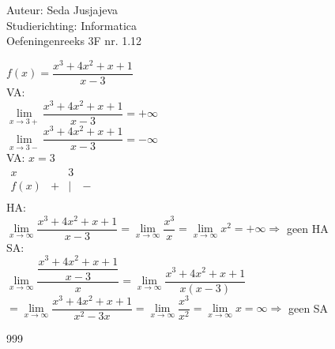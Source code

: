 \documentclass[a4paper]{article}
\newcommand{\limit}{\lim\limits}
\begin{document}
\noindent \large Auteur: Seda Jusjajeva\\
\noindent \large Studierichting: Informatica\\
\noindent \large Oefeningenreeks 3F nr. 1.12 \\

\medskip

\normalsize


$f(x) = \dfrac{x^3 + 4x^2 + x + 1}{x - 3}$ \\

VA: \\

$\limit_{x\rightarrow3+}\dfrac{x^3 + 4x^2 + x + 1}{x - 3} = +\infty$ \\

$\limit_{x\rightarrow3-}\dfrac{x^3 + 4x^2 + x + 1}{x - 3} = -\infty$ \\

VA: $x = 3$\\

$\begin{array}{r|cccc}
    x    &   & 3 &   & \\
    \hline
    f(x) & + & | & - & \\
\end{array}$ \\

HA: \\

$\limit_{x\rightarrow\infty}\dfrac{x^3 + 4x^2 + x + 1}{x - 3} = \limit_{x\rightarrow\infty}\dfrac{x^3}{x} = \limit_{x\rightarrow\infty} x^2 = +\infty \Rightarrow$ geen HA \\

SA: \\

$\limit_{x\rightarrow\infty}\dfrac{\dfrac{x^3 + 4x^2 + x + 1}{x - 3}}{x} = \limit_{x\rightarrow\infty}\dfrac{x^3 + 4x^2 + x + 1}{x(x - 3)}$ \\

$= \limit_{x\rightarrow\infty}\dfrac{x^3 + 4x^2 + x + 1}{x^2 - 3x} = \limit_{x\rightarrow\infty}\dfrac{x^3}{x^2} = \limit_{x\rightarrow\infty} x = \infty\Rightarrow$ geen SA \\



\begin{thebibliography}{999}
\end{thebibliography}
\end{document}
